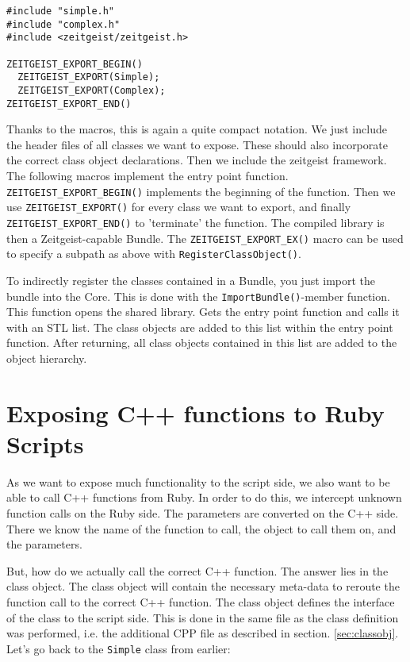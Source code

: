 \begin{verbatim}
#include "simple.h"
#include "complex.h"
#include <zeitgeist/zeitgeist.h>

ZEITGEIST_EXPORT_BEGIN()
  ZEITGEIST_EXPORT(Simple);
  ZEITGEIST_EXPORT(Complex);
ZEITGEIST_EXPORT_END()
\end{verbatim}


Thanks to the macros, this is again a quite compact notation. We just
include the header files of all classes we want to expose. These
should also incorporate the correct class object declarations. Then we
include the zeitgeist framework. The following macros implement the
entry point function. \texttt{ZEITGEIST\_EXPORT\_BEGIN()} implements
the beginning of the function. Then we use
\texttt{ZEITGEIST\_EXPORT()} for every class we want to export, and
finally \texttt{ZEITGEIST\_EXPORT\_END()} to 'terminate' the
function. The compiled library is then a Zeitgeist-capable Bundle. The
\texttt{ZEITGEIST\_EXPORT\_EX()} macro can be used to specify a subpath as above
with \texttt{RegisterClassObject()}.


To indirectly register the classes contained in a Bundle, you just
import the bundle into the Core. This is done with the
\texttt{ImportBundle()}-member function. This function opens the shared
library. Gets the entry point function and calls it with an STL
list. The class objects are added to this list within the entry point
function. After returning, all class objects contained in this list
are added to the object hierarchy.

\section{Exposing C++ functions to Ruby Scripts}

As we want to expose much functionality to the script side, we also
want to be able to call C++ functions from Ruby. In order to do this,
we intercept unknown function calls on the Ruby side. The parameters
are converted on the C++ side. There we know the name of the function
to call, the object to call them on, and the parameters. 

But, how do we actually call the correct C++ function. The answer lies
in the class object. The class object will contain the necessary
meta-data to reroute the function call to the correct C++
function. The class object defines the interface of the class to the
script side. This is done in the same file as the class definition was
performed, i.e. the additional CPP file as described in section.
\ref{sec:classobj}. Let's go back to the \texttt{Simple} class from earlier:

